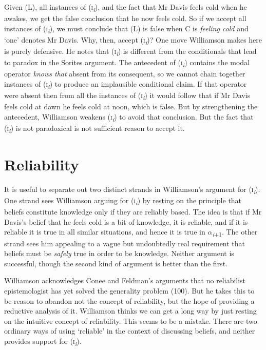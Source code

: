 \noindent Given (L), all instances of (\textsc{i}\textit{\textsubscript{i}}), and the fact that Mr Davis feels cold when he awakes, we get the false conclusion that he now feels cold. So if we accept all instances of (\textsc{i}\textit{\textsubscript{i}}), we must conclude that (L) is false when C is \textit{feeling cold} and `one' denotes Mr Davis. Why, then, accept (\textsc{i}\textit{\textsubscript{i}})? One move Williamson makes here is purely defensive. He notes that (\textsc{i}\textit{\textsubscript{i}}) is different from the conditionals that lead to paradox in the Sorites argument. The antecedent of (\textsc{i}\textit{\textsubscript{i}}) contains the modal operator \textit{knows that} absent from its consequent, so we cannot chain together instances of (\textsc{i}\textit{\textsubscript{i}}) to produce an implausible conditional claim. If that operator were absent then from all the instances of (\textsc{i}\textit{\textsubscript{i}}) it would follow that if Mr Davis feels cold at dawn he feels cold at noon, which is false. But by strengthening the antecedent, Williamson weakens (\textsc{i}\textit{\textsubscript{i}}) to avoid that conclusion. But the fact that (\textsc{i}\textit{\textsubscript{i}}) is not paradoxical is not sufficient reason to accept it.

\section{Reliability}
It is useful to separate out two distinct strands in Williamson's argument for (\textsc{i}\textit{\textsubscript{i}}). One strand sees Williamson arguing for (\textsc{i}\textit{\textsubscript{i}}) by resting on the principle that beliefs constitute knowledge only if they are reliably based. The idea is that if Mr Davis's belief that he feels cold is a bit of knowledge, it is reliable, and if it is reliable it is true in all similar situations, and hence it is true in ${\alpha}$\textit{\textsubscript{i}}\textsubscript{+1}. The other strand sees him appealing to a vague but undoubtedly real requirement that beliefs must be \textit{safely} true in order to be knowledge. Neither argument is successful, though the second kind of argument is better than the first.

Williamson acknowledges Conee and Feldman's arguments that no reliabilist epistemologist has yet solved the generality problem (100). But he takes this to be reason to abandon not the concept of reliability, but the hope of providing a reductive analysis of it. Williamson thinks we can get a long way by just resting on the intuitive concept of reliability. This seems to be a mistake. There are two ordinary ways of using `reliable' in the context of discussing beliefs, and neither provides support for (\textsc{i}\textit{\textsubscript{i}}).

